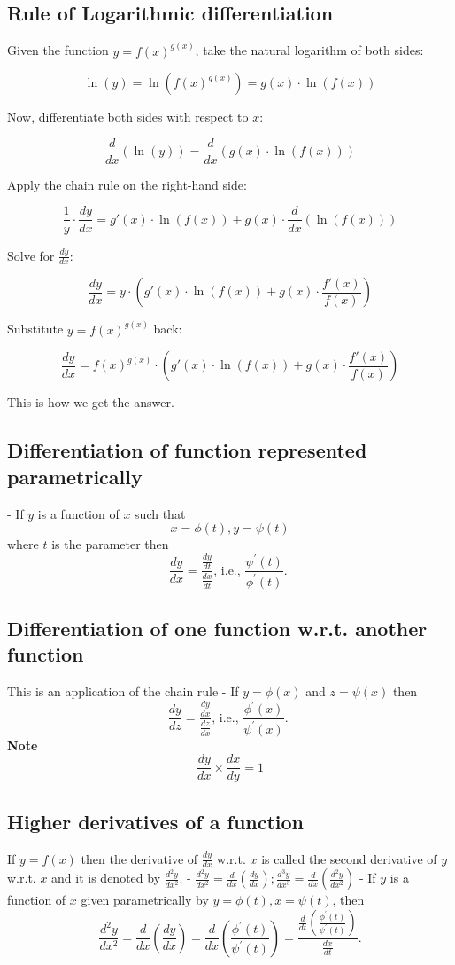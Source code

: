 \subsection{Rule of Logarithmic differentiation}

Given the function \( y = f(x)^{g(x)} \), take the natural logarithm of both sides:

\[
\ln(y) = \ln\left(f(x)^{g(x)}\right) = g(x) \cdot \ln\left(f(x)\right)
\]

Now, differentiate both sides with respect to \( x \):

\[
\frac{d}{dx}(\ln(y)) = \frac{d}{dx}(g(x) \cdot \ln(f(x)))
\]

Apply the chain rule on the right-hand side:

\[
\frac{1}{y} \cdot \frac{dy}{dx} = g'(x) \cdot \ln(f(x)) + g(x) \cdot \frac{d}{dx}(\ln(f(x)))
\]

Solve for \( \frac{dy}{dx} \):

\[
\frac{dy}{dx} = y \cdot \left( g'(x) \cdot \ln(f(x)) + g(x) \cdot \frac{f'(x)}{f(x)} \right)
\]

Substitute \( y = f(x)^{g(x)} \) back:

\[
\frac{dy}{dx} = f(x)^{g(x)} \cdot \left( g'(x) \cdot \ln(f(x)) + g(x) \cdot \frac{f'(x)}{f(x)} \right)
\]

This is how we get the answer. 



\subsection{ Differentiation of function represented parametrically}
- If $y$ is a function of $x$ such that
$$
x=\phi(t), y=\psi(t)
$$
where $t$ is the parameter then
$$
\frac{d y}{d x}=\frac{\frac{d y}{d t}}{\frac{d x}{d t}} \text {, i.e., } \frac{\psi^{\prime}(t)}{\phi^{\prime}(t)} \text {. }
$$


\subsection{ Differentiation of one function w.r.t. another function}

This is an application of the chain rule
- If $y=\phi(x)$ and $z=\psi(x)$ then
$$
\frac{d y}{d z}=\frac{\frac{d y}{d x}}{\frac{d z}{d x}} \text {, i.e., } \frac{\phi^{\prime}(x)}{\psi^{\prime}(x)} \text {. }
$$
\textbf{Note}
 $$\frac{d y}{d x} \times \frac{d x}{d y}=1$$
 
\subsection{Higher derivatives of a function}
If $y=f(x)$ then the derivative of $\frac{d y}{d x}$ w.r.t. $x$ is called the second derivative of $y$ w.r.t. $x$ and it is denoted by $\frac{d^2 y}{d x^2}$. - $\frac{d^2 y}{d x^2}=\frac{d}{d x}\left(\frac{d y}{d x}\right) ; \frac{d^3 y}{d x^3}=\frac{d}{d x}\left(\frac{d^2 y}{d x^2}\right)$
- If $y$ is a function of $x$ given parametrically by $y=\phi(t), x=\psi(t)$, then
$$
\frac{d^2 y}{d x^2}=\frac{d}{d x}\left(\frac{d y}{d x}\right)=\frac{d}{d x}\left(\frac{\phi^{\prime}(t)}{\psi^{\prime}(t)}\right)=\frac{\frac{d}{d t}\left(\frac{\phi^{\prime}(t)}{\psi^{\prime}(t)}\right)}{\frac{d x}{d t}} .
$$
